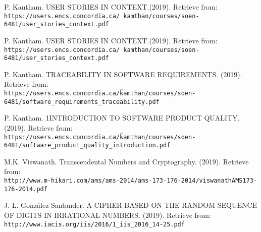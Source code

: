 \documentclass{report}
\begin{document}
\newpage
\begin{thebibliography}{9}

P. Kantham. USER STORIES IN CONTEXT.(2019). Retrieve from:
\\\texttt{https://users.encs.concordia.ca/~kamthan/courses/soen-6481/user\_stories\_context.pdf}


P. Kantham. USER STORIES IN CONTEXT.(2019). Retrieve from:
\\\texttt{https://users.encs.concordia.ca/~kamthan/courses/soen-6481/user\_stories\_context.pdf}

P. Kantham. TRACEABILITY IN SOFTWARE REQUIREMENTS. (2019). Retrieve from:
\\\texttt{https://users.encs.concordia.ca/\~kamthan/courses/soen-6481/software\_requirements\_traceability.pdf}

P. Kantham. 1INTRODUCTION TO SOFTWARE PRODUCT QUALITY. (2019). Retrieve from:
\\\texttt{https://users.encs.concordia.ca/\~kamthan/courses/soen-6481/software\_product\_quality\_introduction.pdf}

M.K. Viswanath. Transcendental Numbers and Cryptography. (2019). Retrieve from:
\\\texttt{http://www.m-hikari.com/ams/ams-2014/ams-173-176-2014/viswanathAMS173-176-2014.pdf}

J. L. González-Santander. A CIPHER BASED ON THE RANDOM SEQUENCE OF DIGITS IN IRRATIONAL NUMBERS. (2019). Retrieve from:
\\\texttt{http://www.iacis.org/iis/2016/1\_iis\_2016\_14-25.pdf}

\end{thebibliography}
\end{document}

